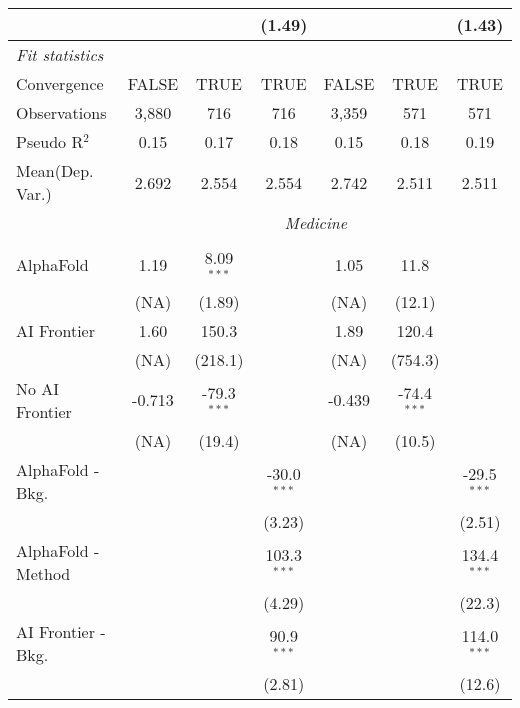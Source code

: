 \begin{tabular}{lcccccc}
                           &              &         & (1.49)        &              &             & (1.43)\\   
   \midrule
   \emph{Fit statistics}\\
   Convergence             &FALSE         & TRUE    & TRUE          & FALSE        & TRUE        & TRUE\\  
   Observations            & 3,880        & 716     & 716           & 3,359        & 571         & 571\\  
   Pseudo R$^2$            & 0.15         & 0.17    & 0.18          & 0.15         & 0.18        & 0.19\\  
   
Mean(Dep. Var.) & 2.692 & 2.554 & 2.554 & 2.742 & 2.511 & 2.511 \\
 & \multicolumn{6}{c}{\textit{Medicine}} \\ \\
   AlphaFold               & 1.19   & 8.09$^{***}$  &               & 1.05   & 11.8          &   \\   
                           & (NA)   & (1.89)        &               & (NA)   & (12.1)        &   \\   
   AI Frontier             & 1.60   & 150.3         &               & 1.89   & 120.4         &   \\   
                           & (NA)   & (218.1)       &               & (NA)   & (754.3)       &   \\   
   No AI Frontier          & -0.713 & -79.3$^{***}$ &               & -0.439 & -74.4$^{***}$ &   \\   
                           & (NA)   & (19.4)        &               & (NA)   & (10.5)        &   \\   
   AlphaFold - Bkg.        &        &               & -30.0$^{***}$ &        &               & -29.5$^{***}$\\   
                           &        &               & (3.23)        &        &               & (2.51)\\   
   AlphaFold - Method      &        &               & 103.3$^{***}$ &        &               & 134.4$^{***}$\\   
                           &        &               & (4.29)        &        &               & (22.3)\\   
   AI Frontier - Bkg.      &        &               & 90.9$^{***}$  &        &               & 114.0$^{***}$\\   
                           &        &               & (2.81)        &        &               & (12.6)\\   

\end{tabular}
